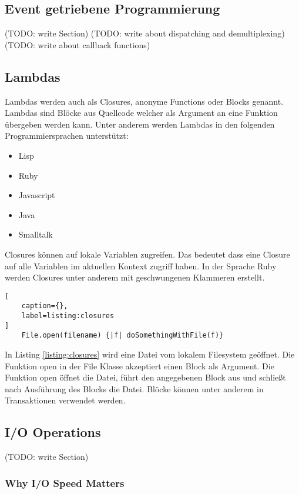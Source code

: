 \subsection{Event getriebene Programmierung}
(TODO: write Section)
(TODO: write about dispatching and demultiplexing)
(TODO: write about callback functions)

\subsection{Lambdas}
Lambdas werden auch als Closures, anonyme Functions oder Blocks genannt. Lambdas sind Blöcke aus Quellcode welcher als Argument an eine Funktion übergeben werden kann. Unter anderem werden Lambdas in den folgenden Programmiersprachen unterstützt:

\begin{itemize}
  \item Lisp
  \item Ruby
  \item Javascript
  \item Java
  \item Smalltalk
\end{itemize}

Closures können auf lokale Variablen zugreifen. Das bedeutet dass eine Closure auf alle Variablen im aktuellen Kontext zugriff haben. In der Sprache Ruby werden Closures unter anderem mit geschwungenen Klammeren erstellt. \cite[]{fow04} 

\begin{lstlisting}[
	caption={},
	label=listing:closures
]
	File.open(filename) {|f| doSomethingWithFile(f)}
\end{lstlisting}
\cite[]{fow04}

In Listing \ref{listing:closures} wird eine Datei vom lokalem Filesystem geöffnet. Die Funktion open in der File Klasse akzeptiert einen Block als Argument. Die Funktion open öffnet die Datei, führt den angegebenen Block aus und schließt nach Ausführung des Blocks die Datei. Blöcke können unter anderem in Transaktionen verwendet werden. \cite[]{fow04}


\subsection{I/O Operations}



(TODO: write Section)

\subsubsection{Why I/O Speed Matters}


